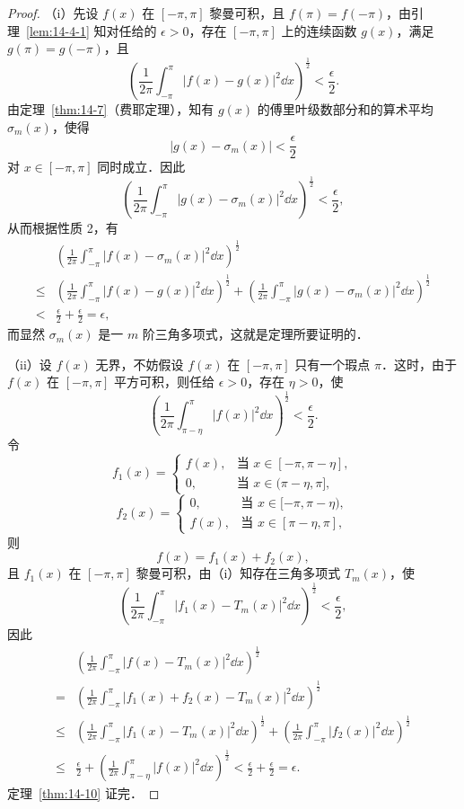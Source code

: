 \begin{proof}
（i）先设 $f(x)$ 在 $[-\pi,\pi]$ 黎曼可积，且 $f(\pi)=f(-\pi)$，由引理~\ref{lem:14-4-1} 知对任给的 $\epsilon>0$，存在 $[-\pi,\pi]$ 上的连续函数 $g(x)$，满足 $g(\pi)=g(-\pi)$，且
\[
\left(\frac{1}{2\pi}\int_{-\pi}^{\pi}\left|f(x)-g(x)\right|^{2}\dd x\right)^{\frac{1}{2}}<\frac{\epsilon}{2}.
\]
由定理~\ref{thm:14-7}（费耶定理），知有 $g(x)$ 的傅里叶级数部分和的算术平均 $\sigma_{m}(x)$，使得
\[
\left|g(x)-\sigma_{m}(x)\right|<\frac{\epsilon}{2}
\]
对 $x\in[-\pi,\pi]$ 同时成立．因此
\[
\left(\frac{1}{2\pi}\int_{-\pi}^{\pi}\left|g(x)-\sigma_{m}(x)\right|^{2}\dd x\right)^{\frac{1}{2}}<\frac{\epsilon}{2},
\]
从而根据性质 2，有
\[
\begin{aligned}
&\left(\frac{1}{2\pi}\int_{-\pi}^{\pi}\left|f(x)-\sigma_{m}(x)\right|^{2}\dd x\right)^{\frac{1}{2}}\\
\leqslant{}&\left(\frac{1}{2\pi}\int_{-\pi}^{\pi}\left|f(x)-g(x)\right|^{2}\dd x\right)^{\frac{1}{2}}+\left(\frac{1}{2\pi}\int_{-\pi}^{\pi}\left|g(x)-\sigma_{m}(x)\right|^{2}\dd x\right)^{\frac{1}{2}}\\
<&\frac{\epsilon}{2}+\frac{\epsilon}{2}=\epsilon,
\end{aligned}
\]
而显然 $\sigma_{m}(x)$ 是一 $m$ 阶三角多项式，这就是定理所要证明的．

（ii）设 $f(x)$ 无界，不妨假设 $f(x)$ 在 $[-\pi,\pi]$ 只有一个瑕点 $\pi$．这时，由于 $f(x)$ 在 $[-\pi,\pi]$ 平方可积，则任给 $\epsilon>0$，存在 $\eta>0$，使
\[
\left(\frac{1}{2\pi}\int_{\pi-\eta}^{\pi}\left|f(x)\right|^{2}\dd x\right)^{\frac{1}{2}}<\frac{\epsilon}{2}.
\]
令
\[
f_{1}(x)=\begin{cases}
f(x), & \text{当 } x\in[-\pi,\pi-\eta],\\
0, & \text{当 } x\in(\pi-\eta,\pi],
\end{cases}
\]
\[
f_{2}(x)=\begin{cases}
0, & \text{当 } x\in[-\pi,\pi-\eta),\\
f(x), & \text{当 } x\in[\pi-\eta,\pi],
\end{cases}
\]
则
\[
f(x)=f_{1}(x)+f_{2}(x),
\]
且 $f_{1}(x)$ 在 $[-\pi,\pi]$ 黎曼可积，由（i）知存在三角多项式 $T_{m}(x)$，使
\[
\left(\frac{1}{2\pi}\int_{-\pi}^{\pi}\left|f_{1}(x)-T_{m}(x)\right|^{2}\dd x\right)^{\frac{1}{2}}<\frac{\epsilon}{2},
\]
因此
\[
\begin{aligned}
&\left(\frac{1}{2\pi}\int_{-\pi}^{\pi}\left|f(x)-T_{m}(x)\right|^{2}\dd x\right)^{\frac{1}{2}}\\
={}&\left(\frac{1}{2\pi}\int_{-\pi}^{\pi}\left|f_{1}(x)+f_{2}(x)-T_{m}(x)\right|^{2}\dd x\right)^{\frac{1}{2}}\\
\leqslant{}&\left(\frac{1}{2\pi}\int_{-\pi}^{\pi}\left|f_{1}(x)-T_{m}(x)\right|^{2}\dd x\right)^{\frac{1}{2}}+\left(\frac{1}{2\pi}\int_{-\pi}^{\pi}\left|f_{2}(x)\right|^{2}\dd x\right)^{\frac{1}{2}}\\
\leqslant{}&\frac{\epsilon}{2}+\left(\frac{1}{2\pi}\int_{\pi-\eta}^{\pi}\left|f(x)\right|^{2}\dd x\right)^{\frac{1}{2}}<\frac{\epsilon}{2}+\frac{\epsilon}{2}=\epsilon.
\end{aligned}
\]
定理~\ref{thm:14-10} 证完．
\end{proof}

